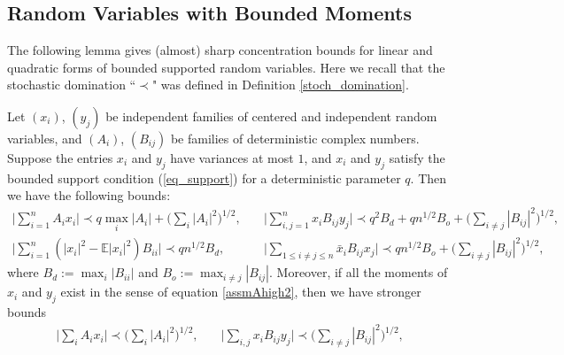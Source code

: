 \subsection{Random Variables with Bounded Moments}
The following lemma gives (almost) sharp concentration bounds for linear and quadratic forms of bounded supported random variables. Here we recall that the stochastic domination ``$\prec$" was defined in Definition \ref{stoch_domination}.

\begin{lemma}\label{largedeviation}
Let $(x_i)$, $(y_j)$ be independent families of centered and independent random variables, and $(A_i)$, $(B_{ij})$ be families of deterministic complex numbers. Suppose the entries $x_i$ and $y_j$ have variances at most $1$, and $ x_i$ and $ y_j$ satisfy the bounded support condition (\ref{eq_support}) for a deterministic parameter $q$. %
Then we have the following bounds:
\begin{align}
\Big| \sum_{i=1}^n A_i x_i \Big\vert \prec  q \max_{i} \vert A_i \vert+ \Big(\sum_i |A_i|^2 \Big)^{1/2} , \quad &\Big\vert  \sum_{i,j=1}^n x_i B_{ij} y_j \Big\vert \prec q^2 B_d  + q n^{1/2}B_o +  \Big(\sum_{i\ne j} |B_{ij}|^2\Big)^{{1}/{2}},\label{eq largedev10}  \\
\Big\vert  \sum_{i=1}^n (|x_i|^2-\mathbb E|x_i|^2) B_{ii}  \Big\vert  \prec q n^{1/2}B_d   , \quad &\Big\vert  \sum_{1\le i\ne j\le n} \bar x_i B_{ij} x_j \Big\vert  \prec qn^{1/2}B_o +  \Big(\sum_{i\ne j} |B_{ij}|^2\Big)^{{1}/{2}} ,\label{eq largedev20} 
\end{align}
where $B_d:=\max_{i} |B_{ii} |$ and $B_o:= \max_{i\ne j} |B_{ij}|.$ Moreover, if all the moments of $ x_i$ and $ y_j$ exist in the sense of equation \eqref{assmAhigh2}, then we have stronger bounds
\begin{align}
\Big\vert \sum_i A_i x_i \Big\vert \prec  \Big(\sum_i |A_i|^2 \Big)^{1/2} , \quad  & \Big\vert \sum_{i,j} x_i B_{ij} y_j \Big\vert \prec  \Big(\sum_{i\ne j} |B_{ij}|^2\Big)^{{1}/{2}} ,\label{eq largedev1} \\

\end{align}
\end{lemma}
